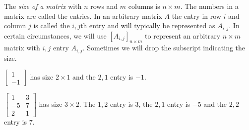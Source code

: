 \begin{definition}
    The \emph{size of a matrix} with \(n\) rows and \(m\) columns is \(n \times m.\) The numbers in a matrix are called the entries. In an arbitrary matrix \(A\) the entry in row \(i\) and column \(j\) is called the \(i,j\)th entry and will typically be represented as \(A_{i,j}.\) In certain circumstances, we will use \(\left[A_{i,j}\right]_{n\times m}\) to represent an arbitrary \(n\times m\) matrix with \(i,j\) entry \(A_{i,j}.\) Sometimes we will drop the subscript indicating the size.
\end{definition}

\begin{example}
    \(\begin{bmatrix}
        1 \\ -1
    \end{bmatrix}\) has size \(2 \times 1\) and the \(2,1\) entry is \(-1.\)

    \(\begin{bmatrix}
        1 & 3 \\
        -5 & 7 \\
        2 & 1
    \end{bmatrix}\) has size \(3 \times 2.\) The \(1,2\) entry is \(3\), the \(2,1\) entry is \(-5\) and the \(2,2\) entry is \(7.\)
\end{example}